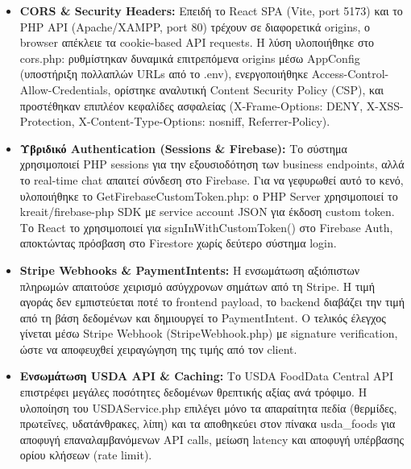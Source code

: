 \documentclass[12pt,a4paper]{report}
\begin{document}
\begin{itemize}
    \item \textbf{CORS \& Security Headers:} Επειδή το \textenglish{React SPA} (Vite, \textenglish{port} 5173) και το \textenglish{PHP API} (Apache/XAMPP, \textenglish{port} 80) τρέχουν σε διαφορετικά \textenglish{origins}, ο \textenglish{browser} απέκλειε τα \textenglish{cookie-based API requests}. Η λύση υλοποιήθηκε στο \textenglish{cors.php}: ρυθμίστηκαν δυναμικά επιτρεπόμενα \textenglish{origins} μέσω \textenglish{AppConfig} (υποστήριξη πολλαπλών \textenglish{URLs} από το \textenglish{.env}), ενεργοποιήθηκε \textenglish{Access-Control-Allow-Credentials}, ορίστηκε αναλυτική \textenglish{Content Security Policy (CSP)}, και προστέθηκαν επιπλέον κεφαλίδες ασφαλείας (\textenglish{X-Frame-Options: DENY}, \textenglish{X-XSS-Protection}, \textenglish{X-Content-Type-Options: nosniff}, \textenglish{Referrer-Policy}).

    \item \textbf{Υβριδικό Authentication (Sessions \& Firebase):} Το σύστημα χρησιμοποιεί \textenglish{PHP sessions} για την εξουσιοδότηση των \textenglish{business endpoints}, αλλά το \textenglish{real-time chat} απαιτεί σύνδεση στο \textenglish{Firebase}. Για να γεφυρωθεί αυτό το κενό, υλοποιήθηκε το \textenglish{GetFirebaseCustomToken.php}: ο \textenglish{PHP Server} χρησιμοποιεί το \textenglish{kreait/firebase-php SDK} με \textenglish{service account JSON} για έκδοση \textenglish{custom token}. Το \textenglish{React} το χρησιμοποιεί για \textenglish{signInWithCustomToken()} στο \textenglish{Firebase Auth}, αποκτώντας πρόσβαση στο \textenglish{Firestore} χωρίς δεύτερο σύστημα \textenglish{login}.

    \item \textbf{Stripe Webhooks \& PaymentIntents:} Η ενσωμάτωση αξιόπιστων πληρωμών απαιτούσε χειρισμό ασύγχρονων σημάτων από τη \textenglish{Stripe}. Η τιμή αγοράς δεν εμπιστεύεται ποτέ το \textenglish{frontend payload}, το \textenglish{backend} διαβάζει την τιμή από τη βάση δεδομένων και δημιουργεί το \textenglish{PaymentIntent}. Ο τελικός έλεγχος γίνεται μέσω \textenglish{Stripe Webhook (StripeWebhook.php)} με \textenglish{signature verification}, ώστε να αποφευχθεί χειραγώγηση της τιμής από τον \textenglish{client}.

    \item \textbf{Ενσωμάτωση USDA API \& Caching:} Το \textenglish{USDA FoodData Central API} επιστρέφει μεγάλες ποσότητες δεδομένων θρεπτικής αξίας ανά τρόφιμο. Η υλοποίηση του \textenglish{USDAService.php} επιλέγει μόνο τα απαραίτητα πεδία (θερμίδες, πρωτεΐνες, υδατάνθρακες, λίπη) και τα αποθηκεύει στον πίνακα \textenglish{usda\_foods} για αποφυγή επαναλαμβανόμενων \textenglish{API calls}, μείωση \textenglish{latency} και αποφυγή υπέρβασης ορίου κλήσεων (\textenglish{rate limit}).


\end{itemize}
\end{document}
